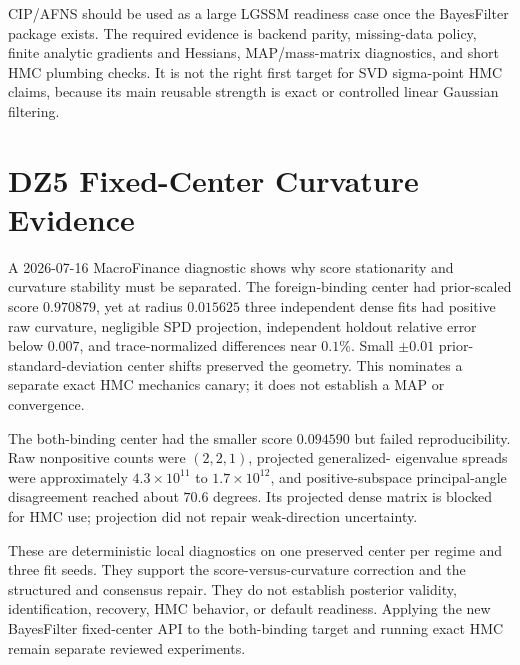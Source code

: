 CIP/AFNS should be used as a large LGSSM readiness case once the BayesFilter
package exists.  The required evidence is backend parity, missing-data policy,
finite analytic gradients and Hessians, MAP/mass-matrix diagnostics, and short
HMC plumbing checks.  It is not the right first target for SVD sigma-point HMC
claims, because its main reusable strength is exact or controlled linear
Gaussian filtering.

\section{DZ5 Fixed-Center Curvature Evidence}
\label{sec:bf-dz5-curvature-evidence}

A 2026-07-16 MacroFinance diagnostic shows why score stationarity and curvature
stability must be separated.  The foreign-binding center had prior-scaled score
$0.970879$, yet at radius $0.015625$ three independent dense fits had positive
raw curvature, negligible SPD projection, independent holdout relative error
below $0.007$, and trace-normalized differences near $0.1\%$.  Small
$\pm0.01$ prior-standard-deviation center shifts preserved the geometry.  This
nominates a separate exact HMC mechanics canary; it does not establish a MAP or
convergence.

The both-binding center had the smaller score $0.094590$ but failed
reproducibility.  Raw nonpositive counts were $(2,2,1)$, projected generalized-
eigenvalue spreads were approximately $4.3\times10^{11}$ to
$1.7\times10^{12}$, and positive-subspace principal-angle disagreement reached
about $70.6$ degrees.  Its projected dense matrix is blocked for HMC use;
projection did not repair weak-direction uncertainty.

These are deterministic local diagnostics on one preserved center per regime
and three fit seeds.  They support the score-versus-curvature correction and
the structured and consensus repair.  They do not establish posterior validity,
identification, recovery, HMC behavior, or default readiness.  Applying the new
BayesFilter fixed-center API to the both-binding target and running exact HMC
remain separate reviewed experiments.
